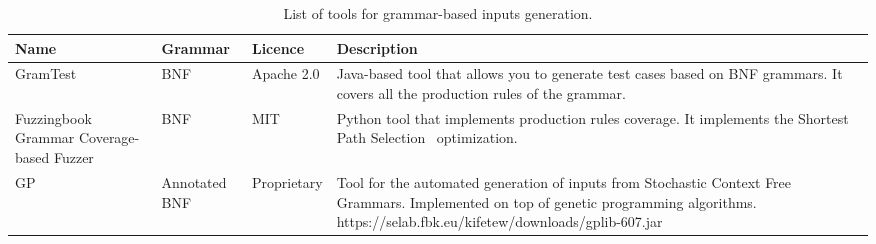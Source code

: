 \begin{table}[h]
\caption{List of tools for grammar-based inputs generation.}
\label{table:grammarGeneration}
\begin{center}
\tiny
\begin{tabular}{|p{2cm}|p{2cm}|p{2cm}|p{7cm}|}
\hline
\textbf{Name}&\textbf{Grammar}&\textbf{Licence}&\textbf{Description}\\
\hline
GramTest~\cite{GramTest}& BNF&Apache 2.0&Java-based tool that allows you to generate test cases based on BNF grammars. It covers all the production rules of the grammar.\\
\hline
Fuzzingbook Grammar Coverage-based Fuzzer~\cite{fuzzingbook2019:GrammarFuzzer}& BNF & MIT &Python tool that implements production rules coverage. It implements the Shortest Path Selection~\cite{Burkhardt:TestFromSyntax} optimization.\\
\hline
GP~\cite{GPlib,Kifetew:GBTest:2017}& Annotated BNF & Proprietary& Tool for the automated generation of inputs from Stochastic Context Free Grammars. Implemented on top of genetic programming algorithms. https://selab.fbk.eu/kifetew/downloads/gplib-607.jar\\
\hline
\end{tabular}
\end{center}
\end{table}%